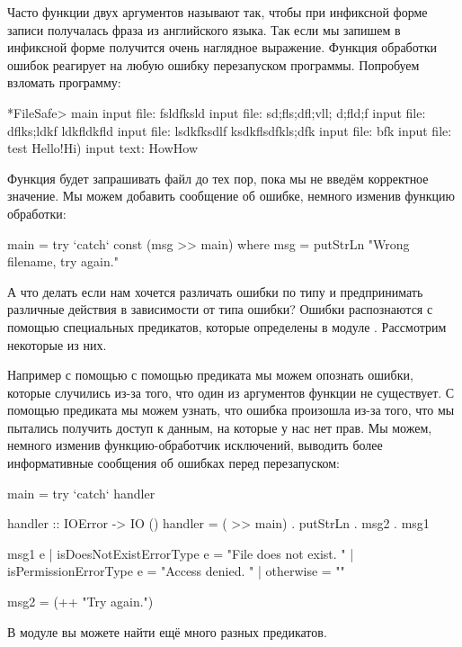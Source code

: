 Часто функции двух аргументов называют так, чтобы
при инфиксной форме записи получалась фраза из английского языка.
Так если мы запишем  в инфиксной форме получится
очень наглядное выражение. 
Функция обработки ошибок реагирует на любую ошибку
перезапуском программы. Попробуем взломать программу:

\begin{code}
*FileSafe> main
input file: fsldfksld
input file: sd;fls;dfl;vll; d;fld;f
input file: dflks;ldkf ldkfldkfld
input file: lsdkfksdlf ksdkflsdfkls;dfk
input file: bfk
input file: test
Hello!Hi)
input text: HowHow
\end{code}

Функция будет запрашивать файл до тех пор, пока мы 
не введём корректное значение. Мы можем добавить 
сообщение об ошибке, немного изменив функцию обработки:

\begin{code}
main = try `catch` const (msg >> main)
    where msg = putStrLn "Wrong filename, try again."
\end{code}

А что делать если нам хочется различать ошибки по типу
и предпринимать различные действия в зависимости от
типа ошибки? 
Ошибки распознаются с помощью специальных предикатов, 
которые определены в модуле .
Рассмотрим некоторые из них.

Например с помощью с помощью предиката 
мы можем опознать ошибки, которые случились из-за того, что
один из аргументов функции не существует. С помощью предиката
 мы можем узнать, что ошибка произошла
из-за того, что мы пытались получить доступ к данным, на
которые у нас нет прав. Мы можем, немного изменив 
функцию-обработчик исключений, выводить более информативные
сообщения об ошибках перед перезапуском:


\begin{code}
main = try `catch` handler

handler :: IOError -> IO ()
handler = ( >> main) . putStrLn . msg2 . msg1

msg1 e 
    | isDoesNotExistErrorType e = "File does not exist. "
    | isPermissionErrorType e   = "Access denied. "
    | otherwise                 = ""

msg2 = (++ "Try again.")
\end{code}

В модуле  вы можете найти ещё много
разных предикатов. 

